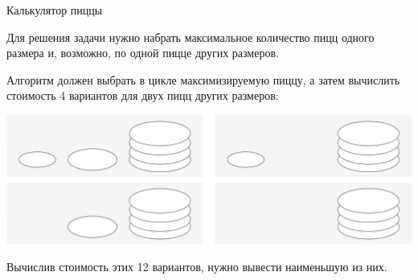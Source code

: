 \begin{tutorial}{Калькулятор пиццы}

Для решения задачи нужно набрать максимальное количество пицц одного размера и, 
возможно, по одной пицце других размеров.

Алгоритм должен выбрать в цикле максимизируемую пиццу, а затем
вычислить стоимость 4 вариантов для двух пицц других размеров:

\begin{center}
\includegraphics[scale=0.3]{pizza.png}
\end{center}

Вычислив стоимость этих 12 вариантов, нужно вывести наименьшую из них.


\end{tutorial}
